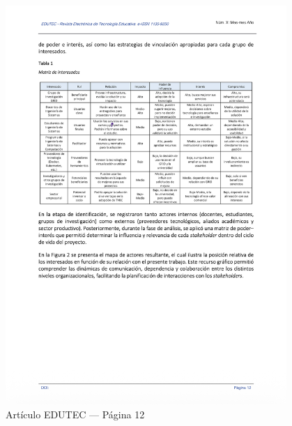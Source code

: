 \begin{figure}[H]
    \centering
    \begin{tcolorbox}[
        colback=white,
        colframe=gray!50,
        boxrule=1pt,
        arc=2pt,
        boxsep=5pt,
        left=3pt,
        right=3pt,
        top=3pt,
        bottom=3pt,
        drop shadow
    ]
        \includegraphics[width=0.95\textwidth,keepaspectratio]{apendices/EDUTEC/12.png}
    \end{tcolorbox}
    \caption{Artículo EDUTEC --- Página 12}\label{fig:edutec-pagina-12}
\end{figure}
\FloatBarrier

